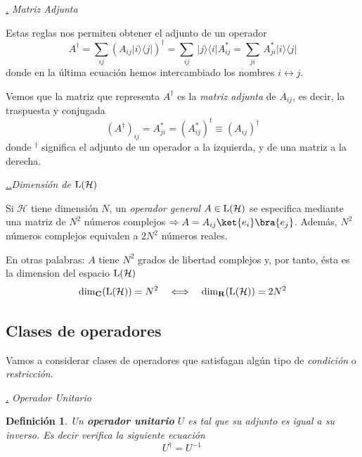 \documentclass[a4paper,11pt]{book} %
\newtheorem{definicion_contador}{Definición}
\newcommand{\Definicion}[1]{
		\begin{mybox_gray2}{}
			\begin{definicion_contador}
				 #1 
			\end{definicion_contador} 
		\end{mybox_gray2}
	}
\numberwithin{equation}{chapter}
\newcommand{\ketbra}[2]{| #1\rangle \! \langle #2|}
\def\subsubiContadorIt{\par\addtocounter{subsubsection}{1}\underline{\it\thesubsubsection.}\hskip0.5cm \setcounter{subsubsubsectionIt}{0}}
\newcommand{\SubsubiIt}[1]{
		\subsubiContadorIt \textit{#1}
	}
\newcounter{subsubsubsectionIt}[subsubsection]
\def\subsubiiContadorIt{\par\addtocounter{subsubsubsectionIt}{1}\underline{\it \thesubsubsection.\thesubsubsubsectionIt.}\hskip0.5cm}
\newcommand{\SubsubiiIt}[1]{
		\subsubiiContadorIt \textit{#1}
	}
\begin{document}
			\SubsubiIt{Matriz Adjunta}

Estas reglas nos permiten obtener el adjunto de un operador
	\begin{equation}
	\boxed{A^\dagger = \sum_{ij}\left( A_{ij}\ketbra{i}{j}\right)^\dagger = \sum_{ij} \, \ketbra{j}{i}A_{ij}^* =  \sum_{ji} \, A_{ji}^*\ketbra{i}{j}}
	\end{equation} 
donde en la última ecuación hemos intercambiado los nombres $i\leftrightarrow j$.

Vemos que la matriz que representa $A^\dagger$ es la \textit{matriz adjunta} de $A_{ij}$, es decir, la traspuesta y conjugada
	\begin{equation}
	(A^\dagger)_{ij} = A^*_{ji} = (A^{*}_{ij})^t \equiv (A_{ij})^\dagger
	\end{equation}
donde $^\dagger$ significa el adjunto de un operador a la izquierda, y de una matriz a la derecha.


			\SubsubiiIt{Dimensión de ${\rm L}(\mathcal{H})$}

Si $\mathcal{H}$ tiene dimensión $N$, un \textit{operador general} $A\in {\rm L}(\mathcal{H})$ se especifica mediante una matriz de $N^2$ números complejos $\Rightarrow A = A_{ij}\ket{e_i}\bra{e_j}$. Además, $N^2$ números complejos equivalen a $2N^2$ números reales. 

En otras palabras: $A$  tiene $N^2$ grados de libertad complejos y, por tanto, ésta es la dimension del espacio ${\rm L}(\mathcal{H})$ 
	\begin{equation}
	{\rm dim}_{\bf C}({\rm L}(\mathcal{H})) = N^2 ~~~ \Longleftrightarrow ~~~ {\rm dim}_{\bf R}({\rm L}(\mathcal{H})) =  2N^2
	\end{equation}



		\subsection{Clases de operadores}

Vamos a considerar clases de operadores que satisfagan algún tipo de \textit{condición} o \textit{restricción}.


			\SubsubiIt{Operador Unitario}

	\Definicion{
	Un \textbf{operador unitario} $U$ es tal que su \textit{adjunto} es igual a su \textit{inverso}. Es decir verifica la siguiente ecuación
		\begin{equation}
		U^\dagger = U^{-1}  \, 
		\end{equation}
	}
\end{document}
